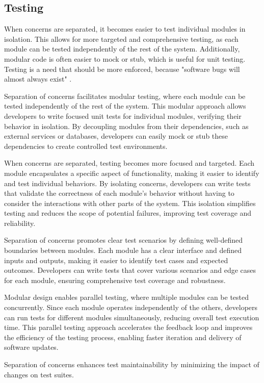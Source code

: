\subsection{Testing} 
When concerns are separated, it becomes easier to test individual modules in isolation.
This allows for more targeted and comprehensive testing, as each module can be tested independently of the rest of the system.
Additionally, modular code is often easier to mock or stub, which is useful for unit testing.
Testing is a need that should be more enforced, because "software bugs will almost always exist" \cite{testing}.
\par
Separation of concerns facilitates modular testing, where each module can be tested independently of the rest of the system.
This modular approach allows developers to write focused unit tests for individual modules, verifying their behavior in isolation.
By decoupling modules from their dependencies, such as external services or databases, developers can easily mock or stub these dependencies to create controlled test environments.
\par
When concerns are separated, testing becomes more focused and targeted.
Each module encapsulates a specific aspect of functionality, making it easier to identify and test individual behaviors.
By isolating concerns, developers can write tests that validate the correctness of each module's behavior without having to consider the interactions with other parts of the system.
This isolation simplifies testing and reduces the scope of potential failures, improving test coverage and reliability.
\par
Separation of concerns promotes clear test scenarios by defining well-defined boundaries between modules.
Each module has a clear interface and defined inputs and outputs, making it easier to identify test cases and expected outcomes.
Developers can write tests that cover various scenarios and edge cases for each module, ensuring comprehensive test coverage and robustness.
\par
Modular design enables parallel testing, where multiple modules can be tested concurrently.
Since each module operates independently of the others, developers can run tests for different modules simultaneously, reducing overall test execution time.
This parallel testing approach accelerates the feedback loop and improves the efficiency of the testing process, enabling faster iteration and delivery of software updates.
 \par
Separation of concerns enhances test maintainability by minimizing the impact of changes on test suites.
